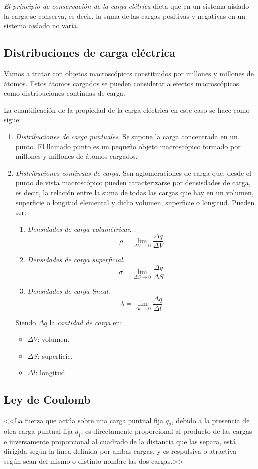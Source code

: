 \documentclass[11pt, oneside, titlepage]{article}
\begin{document}
\emph{El principio de conservación de la carga elétrica} dicta que en un sistema aislado la carga se conserva, es decir, la suma de las cargas positivas y negativas en un sistema aislado no varía.

\subsection{Distribuciones de carga eléctrica}
Vamos a tratar con objetos macroscópicos constituidos por millones y millones de átomos. Estos átomos cargados se pueden considerar a efectos macroscópicos como distribuciones continuas de carga.

La cuantificación de la propiedad de la carga eléctrica en este caso se hace como sigue:

\begin{enumerate}
\item \emph{Distribuciones de carga puntuales}. Se supone la carga concentrada en un punto. El llamado punto es un pequeño objeto macroscópico formado por millones y millones de átomos cargados.
\item \emph{Distribuciones continuas de carga}. Son aglomeraciones de carga que, desde el punto de vista macroscópico pueden caracterizarse por densisdades de carga, es decir, la relación entre la suma de todas las cargas que hay en un volumen, superficie o longitud elemental y dicho volumen, superficie o longitud. Pueden ser:
\begin{enumerate}
\item \emph{Densidades de carga volumétricas}.
\[\rho = \lim\limits_{\Delta V \to 0} \frac{\Delta q}{\Delta V}\]
\item \emph{Densidades de carga superficial}.
\[\sigma = \lim\limits_{\Delta S \to 0} \frac{\Delta q}{\Delta S}\]
\item \emph{Densidades de carga lineal}.
\[\lambda = \lim\limits_{\Delta l \to 0} \frac{\Delta q}{\Delta l}\]
\end{enumerate}
Siendo $\Delta q$ la \emph{cantidad de carga} en:
\begin{itemize}
\item $\Delta V$: volumen.
\item $\Delta S$: superficie.
\item $\Delta l$: longitud.
\end{itemize}
\end{enumerate}

\subsection{Ley de Coulomb}
<<La fuerza que actúa sobre una carga puntual fija $q_2$, debido a la presencia de otra carga puntual fija $q_1$, es directamente proporcional al producto de las cargas e inversamente proporcional al cuadrado de la distancia que las separa, está dirigida según la línea definida por ambas cargas, y es respulsiva o atractiva según sean del mismo o distinto nombre las dos cargas.>>
\end{document}
